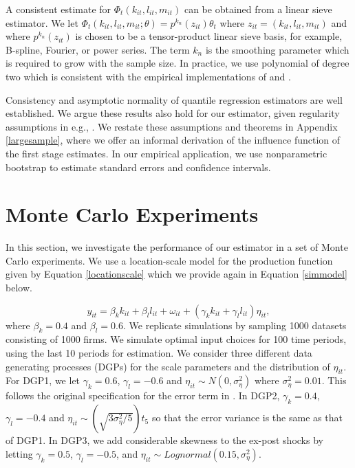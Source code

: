 \documentclass[12pt]{article}
\begin{document}
A consistent estimate for $\Phi_{t}(k_{it}, l_{it}, m_{it})$ can be obtained from a linear sieve estimator. We let $\Phi_{t}(k_{it}, l_{it}, m_{it};\theta)=p^{k_{n}}(z_{it})\theta_{t}$ where $z_{it}=(k_{it}, l_{it}, m_{it})$ and where $p^{k_{n}}(z_{it})$ is chosen to be a tensor-product linear sieve basis, for example, B-spline, Fourier, or power series. The term $k_{n}$ is the smoothing parameter which is required to grow with the sample size.  In practice, we use polynomial of degree two which is consistent with the empirical implementations of \cite{Levinsohn2003} and \cite{Ackerberg2015}. 

Consistency and asymptotic normality of quantile regression estimators are well established. We argue these results also hold for our estimator, given regularity assumptions in e.g.,  \cite{Chernozhukov2005}. We restate these assumptions and theorems in Appendix \ref{largesample}, where we offer an informal derivation of the influence function of the first stage estimates. In our empirical application, we use nonparametric bootstrap to estimate standard errors and confidence intervals.

\section{Monte Carlo Experiments} \label{montecarlo}
In this section, we investigate the performance of our estimator in a set of Monte Carlo experiments. We use a location-scale model for the production function given by Equation \eqref{locationscale} which we provide again in Equation \eqref{simmodel} below.

\begin{equation} \label{simmodel}
y_{it}=\beta_{k}k_{it}+\beta_{l}l_{it}+\omega_{it}+(\gamma_{k}k_{it}+\gamma_{l}l_{it})\eta_{it},
\end{equation}
where $\beta_{k}=0.4$ and $\beta_{l}=0.6$. We replicate \cite{Ackerberg2015} simulations by sampling 1000 datasets consisting of 1000 firms. We simulate optimal input choices for 100 time periods, using the last 10 periods for estimation. We consider three different data generating processes (DGPs) for the scale parameters and the distribution of $\eta_{it}$. For DGP1, we let $\gamma_{k}=0.6$, $\gamma_{l}=-0.6$ and $\eta_{it}\sim N(0,\sigma_{\eta}^{2})$ where $\sigma_{\eta}^{2}=0.01$. This follows the original specification for the error term in \cite{Ackerberg2015}. In DGP2, $\gamma_{k}=0.4$, $\gamma_{l}=-0.4$ and $\eta_{it}\sim (\sqrt{3\sigma_{\eta}^{2}/5})t_{5}$ so that the error variance is the same as that of DGP1. In DGP3, we add considerable skewness to the ex-post shocks by letting $\gamma_{k}=0.5$, $\gamma_{l}=-0.5$, and $\eta_{it}\sim Lognormal(0.15,\sigma_{\eta}^{2})$. 
\end{document}
